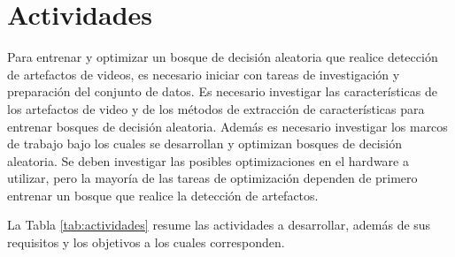 
\chapter{Actividades}
\label{chp:actividades}

Para entrenar y optimizar un bosque de decisión aleatoria que realice detección de artefactos de videos, es necesario iniciar con tareas de investigación y preparación del conjunto de datos. Es necesario investigar las características de los artefactos de video y de los métodos de extracción de características para entrenar bosques de decisión aleatoria. Además es necesario investigar los marcos de trabajo bajo los cuales se desarrollan y optimizan bosques de decisión aleatoria. Se deben investigar las posibles optimizaciones en el hardware a utilizar, pero la mayoría de las tareas de optimización dependen de primero entrenar un bosque que realice la detección de artefactos.

La Tabla \ref{tab:actividades} resume las actividades a desarrollar, además de sus requisitos y los objetivos a los cuales corresponden.

